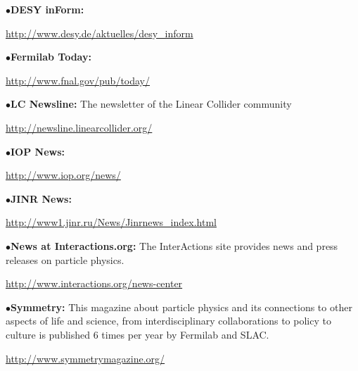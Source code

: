 \item{$\bullet$}{\bf DESY inForm:}
	\item{}\qquad\url{http://www.desy.de/aktuelles/desy\_inform}
\medskip

\item{$\bullet$}{\bf Fermilab Today:}
	\item{}\qquad\url{http://www.fnal.gov/pub/today/}
\medskip

\item{$\bullet$}{\bf LC Newsline:}
The newsletter of the Linear Collider community
	\item{}\qquad\url{http://newsline.linearcollider.org/}
	\item{}
\medskip

\item{$\bullet$}{\bf IOP News:}
     \item{}\qquad\url{http://www.iop.org/news/}

\medskip

\item{$\bullet$}{\bf JINR News:}
 \item{}\qquad\url{http://www1.jinr.ru/News/Jinrnews\_index.html}

\medskip

\item{$\bullet$}{\bf News at Interactions.org:}
The InterActions site provides news and press releases on particle physics.
     \item{}\qquad\url{http://www.interactions.org/news-center}
     \item{}

\medskip





\medskip

\item{$\bullet$}{\bf Symmetry:}
This magazine about particle physics and its connections to other aspects of life and science, from interdisciplinary collaborations to policy to culture is published 6 times per year by Fermilab and SLAC.
     \item{}\qquad\url{http://www.symmetrymagazine.org/}
     \item{}

